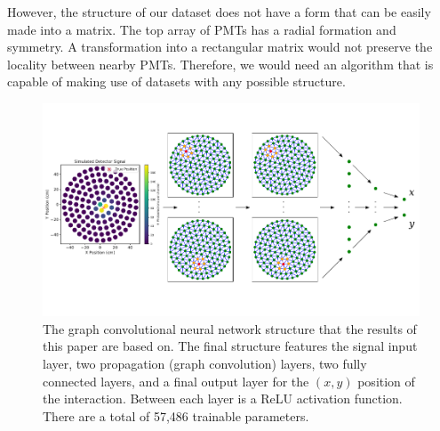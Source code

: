\documentclass[../thesis.tex]{subfiles}
\begin{document}
\par However, the structure of our dataset does not have a form that can be easily made into a matrix.
The top array of PMTs has a radial formation and symmetry.
A transformation into a rectangular matrix would not preserve the locality between nearby PMTs.
Therefore, we would need an algorithm that is capable of making use of datasets with any possible structure.
\begin{figure}[t]
	\centering
	\includegraphics[width=\linewidth]{figures/gcnn_architecture.pdf}
	\caption{
	The graph convolutional neural network structure that the results of this paper are based on.
	The final structure features the signal input layer, two propagation (graph convolution) layers, two fully connected layers, and a final output layer for the $(x,y)$ position of the interaction.
	Between each layer is a ReLU activation function.
	There are a total of 57,486 trainable parameters.
	}
	\label{fig:figures/GCNN_Structure}
\end{figure}
\end{document}

